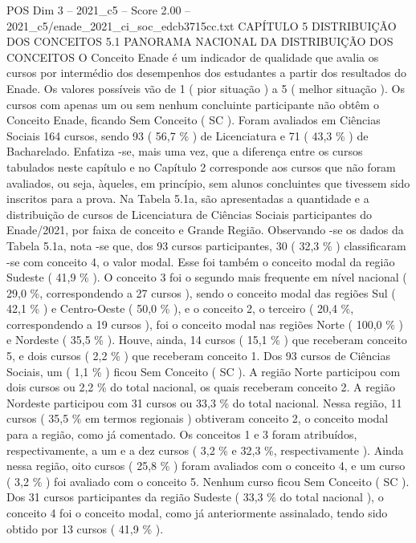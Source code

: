 \begin{textsample}{POS Dim 3 – 2021\_c5 – Score 2.00 – 2021\_c5/enade\_2021\_ci\_soc\_edcb3715cc.txt}  \label{ex:f3_pos_085}
CAPÍTULO 5 DISTRIBUIÇÃO DOS CONCEITOS 5.1 PANORAMA NACIONAL DA DISTRIBUIÇÃO DOS CONCEITOS O Conceito Enade é um indicador de qualidade que avalia os cursos por intermédio dos desempenhos dos estudantes a partir dos resultados do Enade.
Os valores possíveis vão de 1 ( pior situação ) a 5 ( melhor situação ).
Os cursos com apenas um ou sem nenhum concluinte participante não obtêm o Conceito Enade, ficando Sem Conceito ( SC ).
Foram avaliados em Ciências Sociais 164 cursos, sendo 93 ( 56,7 \% ) de Licenciatura e 71 ( 43,3 \% ) de Bacharelado.
Enfatiza -se, mais uma vez, que a diferença entre os cursos tabulados neste capítulo e no Capítulo 2 corresponde aos cursos que não foram avaliados, ou seja, àqueles, em princípio, sem alunos concluintes que tivessem sido inscritos para a prova.
Na Tabela 5.1a, são apresentadas a quantidade e a distribuição de cursos de Licenciatura de Ciências Sociais participantes do Enade/2021, por faixa de conceito e Grande Região.
Observando -se os dados da Tabela 5.1a, nota -se que, dos 93 cursos participantes, 30 ( 32,3 \% ) classificaram -se com conceito 4, o valor modal.
Esse foi também o conceito modal da região Sudeste ( 41,9 \% ).
O conceito 3 foi o segundo mais frequente em nível nacional ( 29,0 \%, correspondendo a 27 cursos ), sendo o conceito modal das regiões Sul ( 42,1 \% ) e Centro-Oeste ( 50,0 \% ), e o conceito 2, o terceiro ( 20,4 \%, correspondendo a 19 cursos ), foi o conceito modal nas regiões Norte ( 100,0 \% ) e Nordeste ( 35,5 \% ).
Houve, ainda, 14 cursos ( 15,1 \% ) que receberam conceito 5, e dois cursos ( 2,2 \% ) que receberam conceito 1.
Dos 93 cursos de Ciências Sociais, um ( 1,1 \% ) ficou Sem Conceito ( SC ).
A região Norte participou com dois cursos ou 2,2 \% do total nacional, os quais receberam conceito 2.
A região Nordeste participou com 31 cursos ou 33,3 \% do total nacional.
Nessa região, 11 cursos ( 35,5 \% em termos regionais ) obtiveram conceito 2, o conceito modal para a região, como já comentado.
Os conceitos 1 e 3 foram atribuídos, respectivamente, a um e a dez cursos ( 3,2 \% e 32,3 \%, respectivamente ).
Ainda nessa região, oito cursos ( 25,8 \% ) foram avaliados com o conceito 4, e um curso ( 3,2 \% ) foi avaliado com o conceito 5.
Nenhum curso ficou Sem Conceito ( SC ).
Dos 31 cursos participantes da região Sudeste ( 33,3 \% do total nacional ), o conceito 4 foi o conceito modal, como já anteriormente assinalado, tendo sido obtido por 13 cursos ( 41,9 \% ).

\end{textsample}
